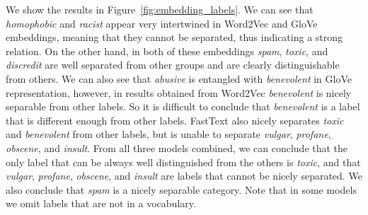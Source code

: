 \documentclass[fleqn,moreauthors,10pt]{ds_report}
\begin{document}
We show the results in Figure~\ref{fig:embedding_labels}. We can see that \textit{homophobic} and \textit{racist} appear very intertwined in Word2Vec and GloVe embeddings, meaning that they cannot be separated, thus indicating a strong relation. On the other hand, in both of these embeddings \textit{spam}, \textit{toxic}, and \textit{discredit} are well separated from other groups and are clearly distinguishable from others. We can also see that \textit{abusive} is entangled with \textit{benevolent} in GloVe representation, however, in results obtained from Word2Vec  \textit{benevolent} is nicely separable from other labels. So it is difficult to conclude that \textit{benevolent} is a label that is different enough from other labels. FastText also nicely separates \textit{toxic} and \textit{benevolent} from other labels, but is unable to separate \textit{vulgar}, \textit{profane}, \textit{obscene}, and \textit{insult}. From all three models combined, we can conclude that the only label that can be always well distinguished from the others is \textit{toxic}, and that \textit{vulgar}, \textit{profane}, \textit{obscene}, and \textit{insult} are labels that cannot be nicely separated. We also conclude that \textit{spam} is a nicely separable category. Note that in some models we omit labels that are not in a vocabulary.
\end{document}
